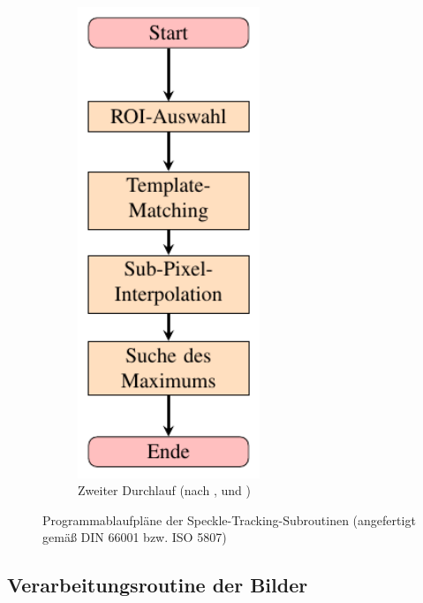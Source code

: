 \begin{figure}[h!]
\begin{subfigure}[b]{0.3\textwidth}
		\includegraphics[width=0.6\textwidth]{pdf/graph_second_pass}
		\caption[Zweiter Durchlauf]{Zweiter Durchlauf (nach , \cite{Ber12} und \cite{Kov04})}
		\label{fig:graph_second}
	\end{subfigure}
	\caption[Algorithmen]{Programmablaufpläne der Speckle-Tracking-Subroutinen (angefertigt gemäß DIN 66001 bzw. ISO 5807)}
\end{figure}

\subsection{Verarbeitungsroutine der Bilder}

